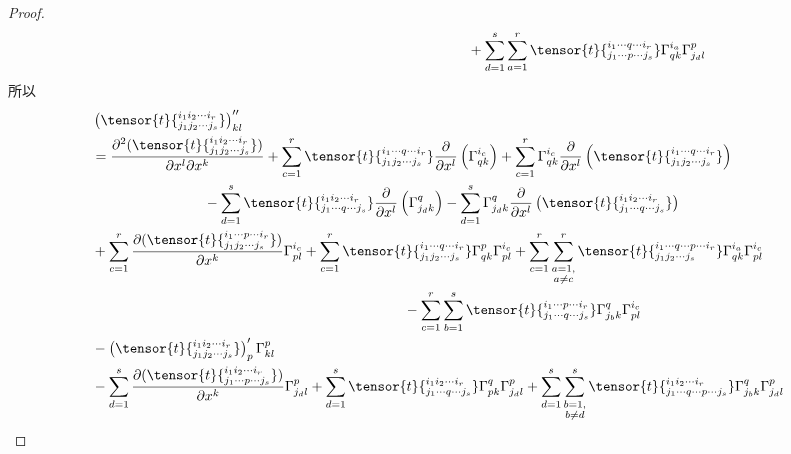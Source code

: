 \begin{proof}
\[\begin{split}
	&\;\quad\quad\quad\quad\quad\quad\quad\quad\quad\quad\quad\quad\quad\quad\quad\quad\quad\quad\quad\quad\quad\quad+\sum_{d=1}^{s}\sum_{a=1}^{r} \tensor{t}{^{i_{1}\cdots q \cdots i_{r}}_{j_{1}\cdots p\cdots j_{s}}}\Gamma_{qk}^{i_{a}}  \Gamma_{j_{d}l}^{p}
\end{split}
\]
所以 
\[
\begin{split}
&\left( \tensor{t}{^{i_{1}i_{2}\cdots i_{r}}_{j_{1}j_{2}\cdots j_{s}}} \right)^{\prime\prime}_{kl}\\
&=\frac{{\partial}^{2}(\tensor{t}{^{i_{1}i_{2}\cdots i_{r}}_{j_{1}j_{2}\cdots j_{s}}})}{\partial x^{l}\partial x^{k}}+\sum_{c=1}^{r}\tensor{t}{^{i_{1}\cdots q\cdots i_{r}}_{j_{1}j_{2}\cdots j_{s}}}\frac{\partial  }{\partial x^{l}} \left( \Gamma_{qk}^{i_{c}} \right) +\sum_{c=1}^{r}\Gamma_{qk}^{i_{c}}\frac{\partial  }{\partial x^{l}}\left( \tensor{t}{^{i_{1}\cdots q\cdots i_{r}}_{j_{1}j_{2}\cdots j_{s}}} \right)\\
& \quad\quad\quad\quad\quad\quad\quad\quad-\sum_{d=1}^{s} \tensor{t}{^{i_{1}i_{2}\cdots i_{r}}_{j_{1}\cdots q\cdots j_{s}}}\frac{\partial  }{\partial x^{l}}\left(\Gamma_{j_{d}k}^{q} \right)-\sum_{d=1}^{s}\Gamma_{j_{d}k}^{q}  \frac{\partial  }{\partial x^{l}}\left(\tensor{t}{^{i_{1}i_{2}\cdots i_{r}}_{j_{1}\cdots q\cdots j_{s}}}\right)\\
&+\sum_{c=1}^{r}\frac{{\partial}(\tensor{t}{^{i_{1}\cdots p\cdots i_{r}}_{j_{1}j_{2}\cdots j_{s}}} )}{\partial x^{k}}\Gamma_{pl}^{i_{c}}+\sum_{c=1}^{r}\tensor{t}{^{i_{1}\cdots q\cdots i_{r}}_{j_{1}j_{2}\cdots j_{s}}} \Gamma_{qk}^{p}\Gamma_{pl}^{i_{c}}+\sum_{c=1}^{r}\sum_{\substack{a=1,\\ a\neq c}}^{r}\tensor{t}{^{i_{1}\cdots q\cdots p\cdots i_{r}}_{j_{1}j_{2}\cdots j_{s}}}\Gamma_{qk}^{i_{a}}\Gamma_{pl}^{i_{c}}\\
&\;\quad\quad\quad\quad\quad\quad\quad\quad\quad\quad\quad\quad\quad\quad\quad\quad\quad\quad\quad\quad\quad\quad-\sum_{c=1}^{r}\sum_{b=1}^{s}\tensor{t}{^{i_{1}\cdots p\cdots i_{r}}_{j_{1}\cdots q\cdots j_{s}}}\Gamma_{j_{b}k}^{q}  \Gamma_{pl}^{i_{c}}\\
&-\left( \tensor{t}{^{i_{1}i_{2}\cdots i_{r}}_{j_{1}j_{2}\cdots j_{s}}} \right)^{\prime}_{p}\Gamma_{kl}^{p}\\
&-\sum_{d=1}^{s}\frac{{\partial}( \tensor{t}{^{i_{1}i_{2}\cdots  i_{r}}_{j_{1}\cdots p\cdots j_{s}}})}{\partial x^{k}}\Gamma_{j_{d}l}^{p}+\sum_{d=1}^{s}\tensor{t}{^{i_{1}i_{2}\cdots  i_{r}}_{j_{1}\cdots q\cdots j_{s}}} \Gamma_{pk}^{q}\Gamma_{j_{d}l}^{p}+\sum_{d=1}^{s}\sum_{\substack{b=1,\\ b\neq d}}^{s}\tensor{t}{^{i_{1}i_{2}\cdots  i_{r}}_{j_{1}\cdots q\cdots p\cdots j_{s}}}\Gamma_{j_{b}k}^{q}\Gamma_{j_{d}l}^{p}\\

\end{split}\]
\end{proof}

